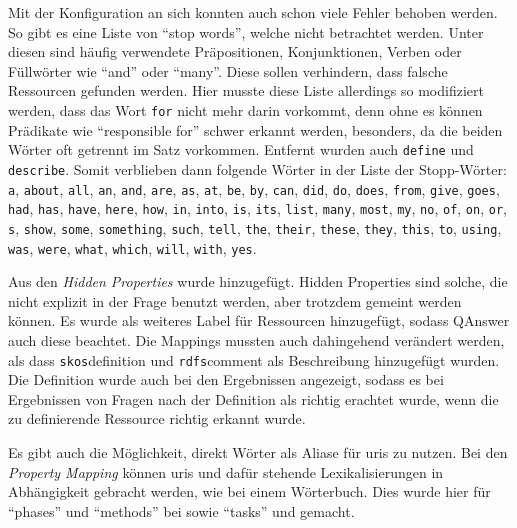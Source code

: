 Mit der Konfiguration an sich konnten auch schon viele Fehler behoben werden.
So gibt es eine Liste von \enquote{stop words}, welche nicht betrachtet werden.
Unter diesen sind häufig verwendete Präpositionen, Konjunktionen, Verben oder Füllwörter wie \enquote{and} oder \enquote{many}.
Diese sollen verhindern, dass falsche Ressourcen gefunden werden.
Hier musste diese Liste allerdings so modifiziert werden, dass das Wort \texttt{for} nicht mehr darin vorkommt, denn ohne es können Prädikate wie \enquote{responsible for} schwer erkannt werden,
besonders, da die beiden Wörter oft getrennt im Satz vorkommen.
Entfernt wurden auch \texttt{define} und \texttt{describe}.
Somit verblieben dann folgende Wörter in der Liste der Stopp-Wörter:
\texttt{a}, \texttt{about}, \texttt{all}, \texttt{an}, \texttt{and}, \texttt{are}, \texttt{as}, \texttt{at}, \texttt{be}, \texttt{by}, \texttt{can}, \texttt{did}, \texttt{do}, \texttt{does}, \texttt{from}, \texttt{give}, \texttt{goes}, \texttt{had}, \texttt{has}, \texttt{have}, \texttt{here}, \texttt{how}, \texttt{in}, \texttt{into}, \texttt{is}, \texttt{its}, \texttt{list}, \texttt{many}, \texttt{most}, \texttt{my}, \texttt{no}, \texttt{of}, \texttt{on}, \texttt{or}, \texttt{s}, \texttt{show}, \texttt{some}, \texttt{something}, \texttt{such}, \texttt{tell}, \texttt{the}, \texttt{their}, \texttt{these}, \texttt{they}, \texttt{this}, \texttt{to}, \texttt{using}, \texttt{was}, \texttt{were}, \texttt{what}, \texttt{which}, \texttt{will}, \texttt{with}, \texttt{yes}.

Aus den \emph{Hidden Properties} wurde  hinzugefügt.
Hidden Properties sind solche, die nicht explizit in der Frage benutzt werden, aber trotzdem gemeint werden können.
Es wurde  als weiteres Label für Ressourcen hinzugefügt, sodass QAnswer auch diese beachtet.
Die Mappings mussten auch dahingehend verändert werden, als dass \texttt{skos}{definition}
und \texttt{rdfs}{comment} als Beschreibung hinzugefügt wurden.
Die Definition wurde auch bei den Ergebnissen angezeigt, sodass es bei Ergebnissen von Fragen nach der Definition als richtig erachtet wurde, wenn die zu definierende Ressource richtig erkannt wurde.

Es gibt auch die Möglichkeit, direkt Wörter als Aliase für \acp{uri} zu nutzen.
Bei den \emph{Property Mapping} können \acp{uri} und dafür stehende Lexikalisierungen in Abhängigkeit gebracht werden, wie bei einem Wörterbuch.
Dies wurde hier für \enquote{phases} und \enquote{methods} bei  sowie \enquote{tasks} und  gemacht.
